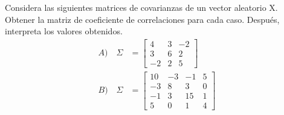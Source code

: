\documentclass[12pt]{article}
\newenvironment{problem}[2][Problema]{\begin{trivlist}
\item[\hskip \labelsep {\bfseries #1}\hskip \labelsep {\bfseries #2.}]}{\end{trivlist}}
\begin{document}

\begin{problem}{1}
Considera las siguientes matrices de covarianzas de un vector aleatorio X. Obtener la matriz de coeficiente de correlaciones para cada caso. Después, interpreta los valores obtenidos.
\begin{align*}
A) \quad \Sigma &=
\begin{bmatrix}
4&3&-2\\
3&6&2\\
-2&2&5
\end{bmatrix}\\
B) \quad \Sigma &=
\begin{bmatrix}
10&-3&-1&5\\
-3&8&3&0\\
-1&3&15&1\\
5&0&1&4
\end{bmatrix}
\end{align*}

\end{problem}
\end{document}
